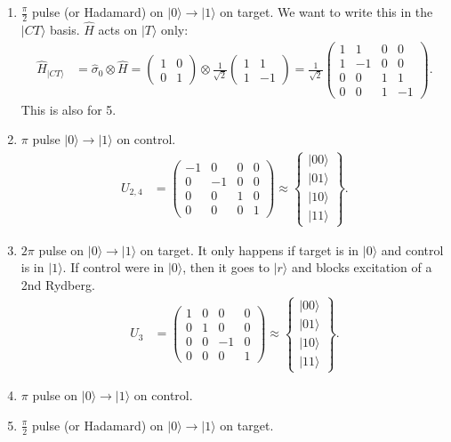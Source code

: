 \documentclass[a4paper, 11pt, normalem]{report}
\begin{document}
\begin{enumerate}
    \item $\frac{\pi}{2}$ pulse (or Hadamard) on $|0\rangle\to|1\rangle$ on target.
        We want to write this in the $|CT\rangle$ basis.
        $\hat{H}$ acts on $|T\rangle$ only:
        \begin{align}
            \hat{H}_{|CT\rangle} &= \hat{\sigma}_0\otimes\hat{H} = \begin{pmatrix}1&0\\0&1\end{pmatrix} \otimes \frac{1}{\sqrt{2}}\begin{pmatrix} 1 & 1 \\ 1 & -1 \end{pmatrix} = \frac{1}{\sqrt{2}}\begin{pmatrix} 1 & 1 & 0 & 0 \\ 1 & -1 & 0 & 0 \\ 0 & 0 & 1 & 1 \\ 0 & 0 & 1 & -1\end{pmatrix}.
        \end{align}
        This is also for 5.
    \item $\pi$ pulse $|0\rangle\to|1\rangle$ on control.
        \begin{align}
            U_{2,4} &= \begin{pmatrix} -1 &0&0&0\\ 0&-1&0&0\\ 0&0&1&0 \\ 0&0&0&1\end{pmatrix} \approx \begin{Bmatrix} |00\rangle \\ |01\rangle \\ |10\rangle \\ |11\rangle\end{Bmatrix}.
        \end{align}
    \item $2\pi$ pulse on $|0\rangle\to|1\rangle$ on target.
        It only happens if target is in $|0\rangle$ and control is in $|1\rangle$.
        If control were in $|0\rangle$, then it goes to $|r\rangle$ and blocks excitation of a 2nd Rydberg.
        \begin{align}
            U_3 &= \begin{pmatrix} 1 & 0 & 0 & 0 \\ 0 & 1 & 0 & 0 \\ 0 & 0 & -1 & 0 \\ 0 & 0 & 0 & 1 \end{pmatrix} \approx \begin{Bmatrix} |00\rangle \\ |01\rangle \\ |10\rangle \\ |11\rangle\end{Bmatrix}.
        \end{align}
    \item $\pi$ pulse on $|0\rangle\to|1\rangle$ on control.
    \item $\frac{\pi}{2}$ pulse (or Hadamard) on $|0\rangle\to|1\rangle$ on target.
\end{enumerate}
\end{document}
